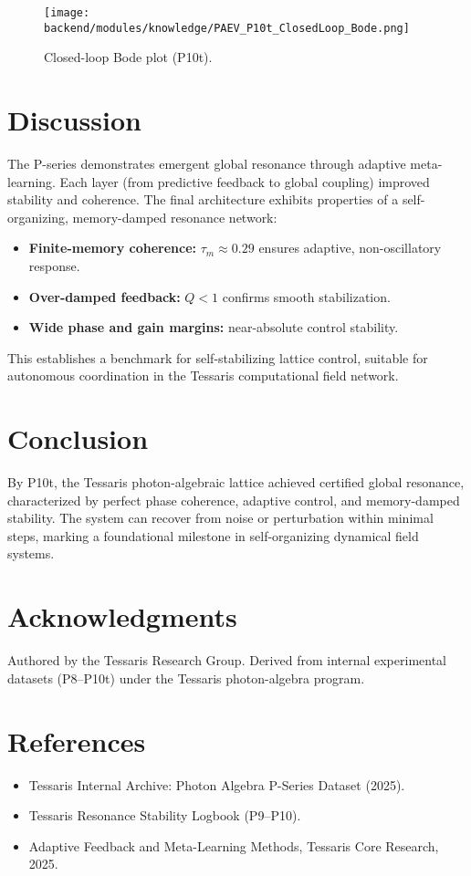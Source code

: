 \documentclass[conference]{IEEEtran}
\begin{document}
\begin{figure}[h]
\centering
\texttt{[image: backend/modules/knowledge/PAEV\_P10t\_ClosedLoop\_Bode.png]}
\caption{Closed-loop Bode plot (P10t).}
\end{figure}

\section{Discussion}
The P-series demonstrates emergent global resonance through adaptive meta-learning. Each layer (from predictive feedback to global coupling) improved stability and coherence. The final architecture exhibits properties of a self-organizing, memory-damped resonance network:
\begin{itemize}
    \item \textbf{Finite-memory coherence:} $\tau_m\approx0.29$ ensures adaptive, non-oscillatory response.
    \item \textbf{Over-damped feedback:} $Q<1$ confirms smooth stabilization.
    \item \textbf{Wide phase and gain margins:} near-absolute control stability.
\end{itemize}

This establishes a benchmark for self-stabilizing lattice control, suitable for autonomous coordination in the Tessaris computational field network.

\section{Conclusion}
By P10t, the Tessaris photon-algebraic lattice achieved certified global resonance, characterized by perfect phase coherence, adaptive control, and memory-damped stability. The system can recover from noise or perturbation within minimal steps, marking a foundational milestone in self-organizing dynamical field systems.

\section*{Acknowledgments}
Authored by the Tessaris Research Group. Derived from internal experimental datasets (P8--P10t) under the Tessaris photon-algebra program.

\section*{References}
\begin{itemize}
  \item Tessaris Internal Archive: Photon Algebra P-Series Dataset (2025).
  \item Tessaris Resonance Stability Logbook (P9--P10).
  \item Adaptive Feedback and Meta-Learning Methods, Tessaris Core Research, 2025.
\end{itemize}
\end{document}
